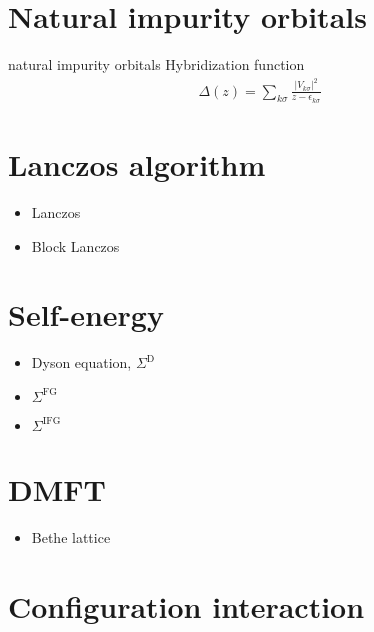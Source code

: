 \section{Natural impurity orbitals}

natural impurity orbitals
Hybridization function
\begin{align}
    \Delta(z) = \sum_{k\sigma} \frac{|V_{k\sigma}|^2}{z - \epsilon_{k\sigma}}
\end{align}

\section{Lanczos algorithm}

\begin{itemize}
    \item Lanczos
    \item Block Lanczos
\end{itemize}

\section{Self-energy}

\begin{itemize}
    \item Dyson equation, $\Sigma^\mathrm{D}$
    \item $\Sigma^\mathrm{FG}$
    \item $\Sigma^\mathrm{IFG}$
\end{itemize}

\section{DMFT}

\begin{itemize}
    \item Bethe lattice
\end{itemize}

\section{Configuration interaction}
